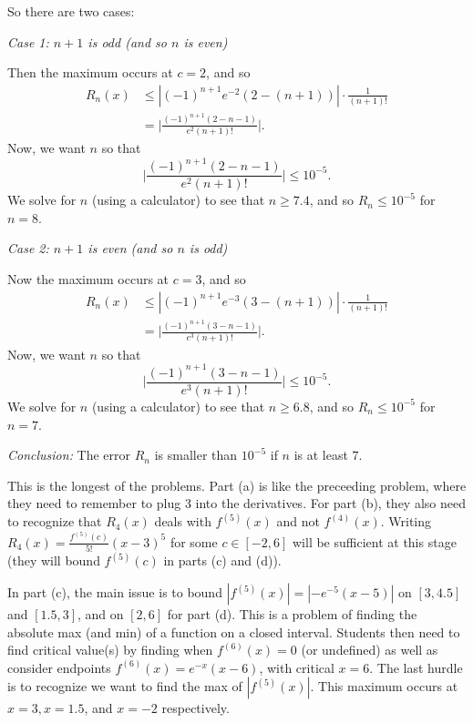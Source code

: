 \documentclass[noinstructornotes]{ximera}
\begin{document}
\begin{problem}
\begin{freeResponse}
\begin{enumerate}
	So there are two cases:
	
	\vskip 10pt
	
	{\it Case 1:  $n+1$ is odd (and so $n$ is even)}
	
	Then the maximum occurs at $c=2$, and so
		\begin{align*}
		R_n(x) &\leq | (-1)^{n+1} e^{-2} (2 - (n+1)) | \cdot \frac{1}{(n+1)!}  \\
		&= \biggr| \frac{(-1)^{n+1} (2-n-1)}{e^2 (n+1)!} \biggr| .
		\end{align*}
	Now, we want $n$ so that 
		\[
		\biggr| \frac{(-1)^{n+1} (2-n-1)}{e^2 (n+1)!} \biggr| \leq 10^{-5}.
		\]
	We solve for $n$ (using a calculator) to see that $n \geq 7.4$, and so $R_n \leq 10^{-5}$ for $n = 8$.
	
	\vskip 10pt
	
	{\it Case 2:  $n+1$ is even (and so $n$ is odd)}
	
	Now the maximum occurs at $c=3$, and so
		\begin{align*}
		R_n(x) &\leq | (-1)^{n+1} e^{-3} (3 - (n+1)) | \cdot \frac{1}{(n+1)!}  \\
		&= \biggr| \frac{(-1)^{n+1} (3-n-1)}{e^3 (n+1)!} \biggr| .
		\end{align*}
	Now, we want $n$ so that 
		\[
		\biggr| \frac{(-1)^{n+1} (3-n-1)}{e^3 (n+1)!} \biggr| \leq 10^{-5}.
		\]
	We solve for $n$ (using a calculator) to see that $n \geq 6.8$, and so $R_n \leq 10^{-5}$ for $n = 7$.
	
	\vskip 10pt
	
	{\it Conclusion:} The error $R_n$ is smaller than $10^{-5}$ if $n$ is at least $7$.
	
	
	
	\end{enumerate}
	\end{freeResponse}

\end{problem}

\begin{instructorNotes}
This is the longest of the problems.  
Part (a) is like the preceeding problem, where they need to remember to plug $3$ into the derivatives.  
For part (b), they also need to recognize that $R_4(x)$ deals with $f^{(5)}(x)$ and not $f^{(4)}(x)$.  
Writing $R_4(x) = \frac{f^{(5)}(c)}{5!} (x-3)^5$ for some $c \in [-2,6]$ will be sufficient at this stage (they will bound $f^{(5)}(c)$ in parts (c) and (d)).  

In part (c), the main issue is to bound $|f^{(5)}(x)| = |-e^{-5}(x-5)|$ on $[3,4.5]$ and $[1.5,3]$, and on $[2,6]$ for part (d).  
This is a problem of finding the absolute max (and min) of a function on a closed interval.  
Students then need to find critical value(s) by finding when $f^{(6)}(x) = 0$ (or undefined) as well as consider endpoints $f^{(6)}(x) = e^{-x}(x-6)$, with critical $x=6$.  
The last hurdle is to recognize we want to find the max of $|f^{(5)}(x)|$.  
This maximum occurs at $x=3, x=1.5$, and $x=-2$ respectively.
\end{instructorNotes}
\end{document}

